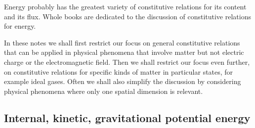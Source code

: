 \documentclass[a4paper,12pt,%
onecolumn,oneside,%
british%
]{memoir}
\renewcommand*{\|}[1][]{\nonscript\:#1\vert\nonscript\:\mathopen{}}
\begin{document}
Energy probably has the greatest variety of constitutive relations for its content and its flux. Whole books are dedicated to the discussion of constitutive relations for energy.

In these notes we shall first restrict our focus on general constitutive relations that can be applied in physical phenomena that involve matter but not electric charge or the electromagnetic field. Then we shall restrict our focus even further, on constitutive relations for specific kinds of matter in particular states, for example ideal gases. Often we shall also simplify the discussion by considering physical phenomena where only one spatial dimension is relevant.

\subsection{Internal, kinetic, gravitational potential energy}
\label{sec:energy_volume_matter}
\end{document}
